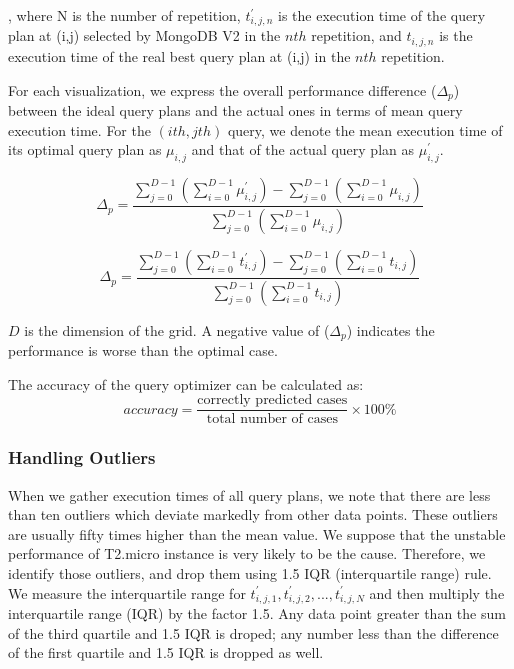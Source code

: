 , where N is the number of repetition, $t_{i,j,n}^{'}$ 
is the execution time of the query plan at (i,j) selected
by MongoDB V2 in the $nth$ repetition, and $t_{i,j,n}$ is
the execution time of the real best query plan at (i,j) 
in the $nth$ repetition. 

For each visualization, we express the overall performance
difference ($\Delta_p$) between the ideal query plans and
the actual ones in terms of mean query execution time. For
the $(ith, jth)$ query, we denote the mean execution time 
of its optimal query plan as $\mu_{i,j}$ and that of the 
actual query plan as $\mu_{i,j}^{'}$.

\begin{equation}
    \Delta_p = \frac{\sum\limits_{j=0}^{D-1}(\sum\limits_{i=0}^{D-1}\mu_{i,j}^{'}) - \sum\limits_{j=0}^{D-1}(\sum\limits_{i=0}^{D-1}\mu_{i,j})}       {\sum\limits_{j=0}^{D-1}(\sum\limits_{i=0}^{D-1}\mu_{i,j})}
\end{equation}

\begin{equation}
    \Delta_p = \frac{\sum\limits_{j=0}^{D-1}(\sum\limits_{i=0}^{D-1}t_{i,j}^{'}) - \sum\limits_{j=0}^{D-1}(\sum\limits_{i=0}^{D-1}t_{i,j})}       {\sum\limits_{j=0}^{D-1}(\sum\limits_{i=0}^{D-1}t_{i,j})}
\end{equation}

$D$ is the dimension of the grid. A negative value of 
($\Delta_p$) indicates the performance is worse than the 
optimal case.

The accuracy of the query optimizer can be calculated as:
\begin{equation}
    accuracy = \frac{\text{correctly predicted cases}}{\text{total number of cases}} \times 100\%
\end{equation}

\subsubsection{Handling Outliers}
When we gather execution times of all query plans, we note
that there are less than ten outliers which deviate markedly 
from other data points. These outliers are usually fifty 
times higher than the mean value. We suppose that the 
unstable performance of T2.micro instance is very likely 
to be the cause. Therefore, we identify those outliers, 
and drop them using 1.5 IQR (interquartile range) rule. 
We measure the interquartile range for $t_{i,j,1}^{'}, 
t_{i,j,2}^{'}, ..., t_{i,j,N}^{'}$ and then multiply the
interquartile range (IQR) by the factor 1.5. Any data point
greater than the sum of the third quartile and 1.5 IQR is 
droped; any number less than the difference of the first 
quartile and 1.5 IQR is dropped as well.


